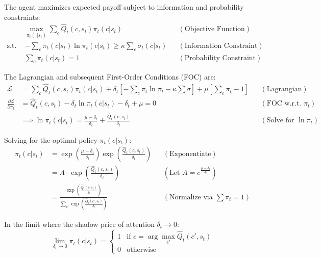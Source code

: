 The agent maximizes expected payoff subject to information and probability constraints:
\begin{align*}
    &\max_{\pi_t(\cdot|s_t)} \sum_c \hat{Q}_t(c, s_t) \pi_t(c|s_t) && (\text{Objective Function}) \\
    \text{s.t. } &-\sum_c \pi_t(c|s_t) \ln \pi_t(c|s_t) \geq \kappa \sum_c \sigma_t(c|s_t) && (\text{Information Constraint}) \\
    &\sum_c \pi_t(c|s_t) = 1 && (\text{Probability Constraint})
\end{align*}

The Lagrangian and subsequent First-Order Conditions (FOC) are:
\begin{align*}
    \mathcal{L} &= \sum_c \hat{Q}_t(c, s_t) \pi_t(c|s_t) + \delta_t \left[ -\sum_c \pi_t \ln \pi_t - \kappa \sum \sigma \right] + \mu \left[ \sum_c \pi_t - 1 \right] && (\text{Lagrangian}) \\
    \frac{\partial \mathcal{L}}{\partial \pi_t} &= \hat{Q}_t(c, s_t) - \delta_t \ln \pi_t(c|s_t) - \delta_t + \mu = 0 && (\text{FOC w.r.t. } \pi_t) \\
    &\implies \ln \pi_t(c|s_t) = \frac{\mu - \delta_t}{\delta_t} + \frac{\hat{Q}_t(c, s_t)}{\delta_t} && (\text{Solve for } \ln \pi_t)
\end{align*}

Solving for the optimal policy $\pi_t(c|s_t)$:
\begin{align*}
    \pi_t(c|s_t) &= \exp \left( \frac{\mu - \delta_t}{\delta_t} \right) \exp \left( \frac{\hat{Q}_t(c, s_t)}{\delta_t} \right) && (\text{Exponentiate}) \\
    &= A \cdot \exp \left( \frac{\hat{Q}_t(c, s_t)}{\delta_t} \right) && (\text{Let } A = e^{\frac{\mu-\delta_t}{\delta_t}}) \\
    &= \frac{\exp \left( \frac{\hat{Q}_t(c, s_t)}{\delta_t} \right)}{\sum_{c'} \exp \left( \frac{\hat{Q}_t(c', s_t)}{\delta_t} \right)} && (\text{Normalize via } \sum \pi_t = 1)
\end{align*}

In the limit where the shadow price of attention $\delta_t \to 0$:
\begin{equation*}
    \lim_{\delta_t \to 0} \pi_t(c|s_t) = 
    \begin{cases} 
    1 & \text{if } c = \arg\max_{c'} \hat{Q}_t(c', s_t) \\ 
    0 & \text{otherwise} 
    \end{cases}
\end{equation*}

